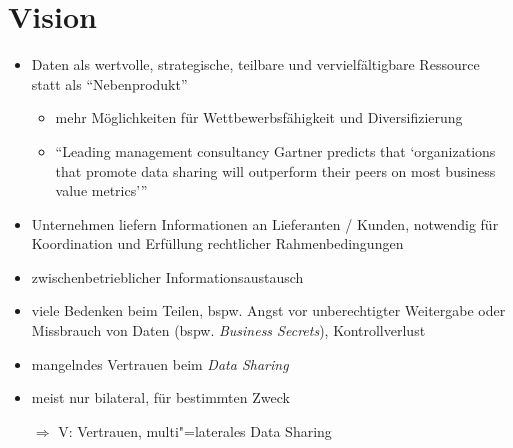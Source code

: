 
\section{Vision}

\begin{itemize}
    \item Daten als wertvolle, strategische, teilbare und vervielfältigbare Ressource statt als \enquote{Nebenprodukt}~\cite{mollerIndustrialDataEcosystems2024}
    \begin{itemize}
        \item mehr Möglichkeiten für Wettbewerbsfähigkeit und Diversifizierung~\cite{mollerIndustrialDataEcosystems2024}
        \item \enquote{Leading management consultancy Gartner predicts that \enquote{organizations that promote data sharing will outperform their peers on most business value metrics}}~\cite{mollerIndustrialDataEcosystems2024}
    \end{itemize}
    \item Unternehmen liefern Informationen an Lieferanten / Kunden, notwendig für Koordination und Erfüllung rechtlicher Rahmenbedingungen~\cite{mollerIndustrialDataEcosystems2024}
    \item zwischenbetrieblicher Informationsaustausch ~\cite{mollerIndustrialDataEcosystems2024}
    \item viele Bedenken beim Teilen, bspw. Angst vor unberechtigter Weitergabe oder Missbrauch von Daten (bspw. \emph{Business Secrets}), Kontrollverlust~\cite{mollerIndustrialDataEcosystems2024}
    \item mangelndes Vertrauen beim \emph{Data Sharing}
    \item meist nur bilateral, für bestimmten Zweck~\cite{mollerIndustrialDataEcosystems2024}
    \item[$\Rightarrow$] V: Vertrauen, multi"=laterales Data Sharing
\end{itemize}

\vspace{1cm}

